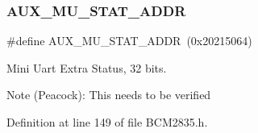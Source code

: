 \mbox{\label{group__UART_ga3ab600905dcef74e8756dcc8d54c6ef9}} 
\subsubsection{\texorpdfstring{A\+U\+X\+\_\+\+M\+U\+\_\+\+S\+T\+A\+T\+\_\+\+A\+D\+DR}{AUX\_MU\_STAT\_ADDR}}
{\footnotesize\ttfamily \#define A\+U\+X\+\_\+\+M\+U\+\_\+\+S\+T\+A\+T\+\_\+\+A\+D\+DR~(0x20215064)}



Mini Uart Extra Status, 32 bits. 

\begin{DoxyNote}{Note}
(Peacock)\+: This needs to be verified 
\end{DoxyNote}


Definition at line 149 of file B\+C\+M2835.\+h.

